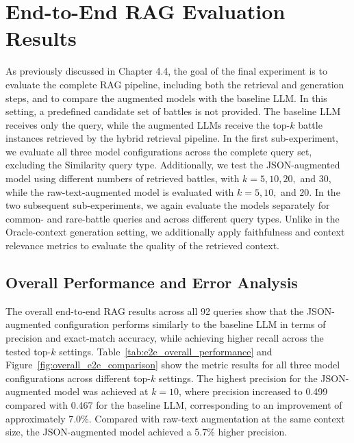 \section{End-to-End RAG Evaluation Results}
As previously discussed in Chapter 4.4, the goal of the final experiment is to evaluate the complete RAG pipeline, including both the retrieval and generation steps, and to compare the augmented models with the baseline LLM. In this setting, a predefined candidate set of battles is not provided. The baseline LLM receives only the query, while the augmented LLMs receive the top-$k$ battle instances retrieved by the hybrid retrieval pipeline. In the first sub-experiment, we evaluate all three model configurations across the complete query set, excluding the Similarity query type. Additionally, we test the JSON-augmented model using different numbers of retrieved battles, with \(k = 5, 10, 20,\) and \(30\), while the raw-text-augmented model is evaluated with \(k = 5, 10,\) and \(20\). In the two subsequent sub-experiments, we again evaluate the models separately for common- and rare-battle queries and across different query types. Unlike in the Oracle-context generation setting, we additionally apply faithfulness and context relevance metrics to evaluate the quality of the retrieved context.
\subsection{Overall Performance and Error Analysis}
The overall end-to-end RAG results across all 92 queries show that the JSON-augmented configuration performs similarly to the baseline LLM in terms of precision and exact-match accuracy, while achieving higher recall across the tested top-\(k\) settings. Table~\ref{tab:e2e_overall_performance} and Figure~\ref{fig:overall_e2e_comparison} show the metric results for all three model configurations across different top-\(k\) settings. The highest precision for the JSON-augmented model was achieved at \(k=10\), where precision increased to 0.499 compared with 0.467 for the baseline LLM, corresponding to an improvement of approximately 7.0\%. Compared with raw-text augmentation at the same context size, the JSON-augmented model achieved a 5.7\% higher precision.

